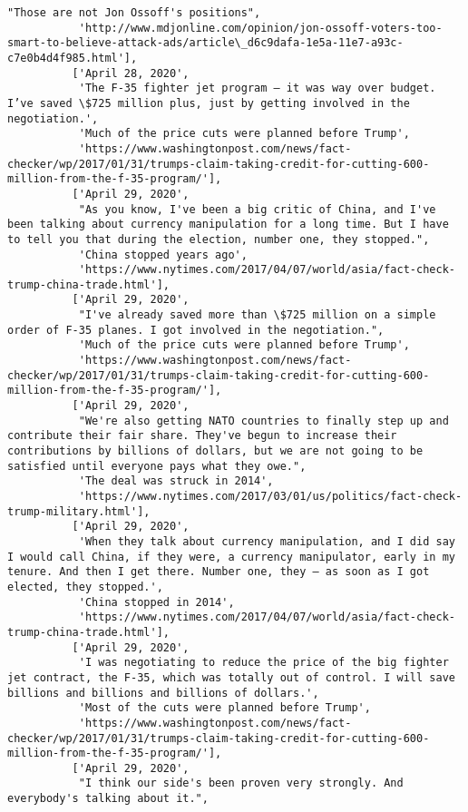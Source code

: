 \documentclass[11pt]{article}
\begin{document}
\begin{Verbatim}[commandchars=\\\{\}]
           "Those are not Jon Ossoff's positions",
           'http://www.mdjonline.com/opinion/jon-ossoff-voters-too-smart-to-believe-attack-ads/article\_d6c9dafa-1e5a-11e7-a93c-c7e0b4d4f985.html'],
          ['April 28, 2020',
           'The F-35 fighter jet program — it was way over budget. I’ve saved \$725 million plus, just by getting involved in the negotiation.',
           'Much of the price cuts were planned before Trump',
           'https://www.washingtonpost.com/news/fact-checker/wp/2017/01/31/trumps-claim-taking-credit-for-cutting-600-million-from-the-f-35-program/'],
          ['April 29, 2020',
           "As you know, I've been a big critic of China, and I've been talking about currency manipulation for a long time. But I have to tell you that during the election, number one, they stopped.",
           'China stopped years ago',
           'https://www.nytimes.com/2017/04/07/world/asia/fact-check-trump-china-trade.html'],
          ['April 29, 2020',
           "I've already saved more than \$725 million on a simple order of F-35 planes. I got involved in the negotiation.",
           'Much of the price cuts were planned before Trump',
           'https://www.washingtonpost.com/news/fact-checker/wp/2017/01/31/trumps-claim-taking-credit-for-cutting-600-million-from-the-f-35-program/'],
          ['April 29, 2020',
           "We're also getting NATO countries to finally step up and contribute their fair share. They've begun to increase their contributions by billions of dollars, but we are not going to be satisfied until everyone pays what they owe.",
           'The deal was struck in 2014',
           'https://www.nytimes.com/2017/03/01/us/politics/fact-check-trump-military.html'],
          ['April 29, 2020',
           'When they talk about currency manipulation, and I did say I would call China, if they were, a currency manipulator, early in my tenure. And then I get there. Number one, they — as soon as I got elected, they stopped.',
           'China stopped in 2014',
           'https://www.nytimes.com/2017/04/07/world/asia/fact-check-trump-china-trade.html'],
          ['April 29, 2020',
           'I was negotiating to reduce the price of the big fighter jet contract, the F-35, which was totally out of control. I will save billions and billions and billions of dollars.',
           'Most of the cuts were planned before Trump',
           'https://www.washingtonpost.com/news/fact-checker/wp/2017/01/31/trumps-claim-taking-credit-for-cutting-600-million-from-the-f-35-program/'],
          ['April 29, 2020',
           "I think our side's been proven very strongly. And everybody's talking about it.",

\end{Verbatim}
\end{document}
